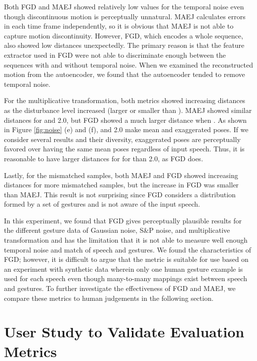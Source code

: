 \documentclass[acmtog]{acmart}
\begin{document}
Both FGD and MAEJ showed relatively low values for the temporal noise even though discontinuous motion is perceptually unnatural. MAEJ calculates errors in each time frame independently, so it is obvious that MAEJ is not able to capture motion discontinuity. However, FGD, which encodes a whole sequence, also showed low distances unexpectedly. The primary reason is that the feature extractor used in FGD were not able to discriminate enough between the sequences with and without temporal noise. When we examined the reconstructed motion from the autoencoder, we found that the autoencoder tended to remove temporal noise.

For the multiplicative transformation, both metrics showed increasing distances as the disturbance level increased (larger or smaller than ). MAEJ showed similar distances for  and 2.0, but FGD showed a much larger distance when . As shown in Figure \ref{fig:noise} (e) and (f),  and 2.0 make mean and exaggerated poses. If we consider several results and their diversity, exaggerated poses are perceptually favored over having the same mean poses regardless of input speech. Thus, it is reasonable to have larger distances for  for than 2.0, as FGD does.

Lastly, for the mismatched samples, both MAEJ and FGD showed increasing distances for more mismatched samples, but the increase in FGD was smaller than MAEJ. This result is not surprising since FGD considers a distribution formed by a set of gestures and is not aware of the input speech.

In this experiment, we found that FGD gives perceptually plausible results for the different gesture data of Gaussian noise, S\&P noise, and multiplicative transformation and has the limitation that it is not able to measure well enough temporal noise and match of speech and gestures. We found the characteristics of FGD; however, it is difficult to argue that the metric is suitable for use based on an experiment with synthetic data wherein only one human gesture example is used for each speech even though many-to-many mappings exist between speech and gestures. To further investigate the effectiveness of FGD and MAEJ, we compare these metrics to human judgements in the following section.

\section{User Study to Validate Evaluation Metrics} \label{sec:human_evaluation}
\end{document}
